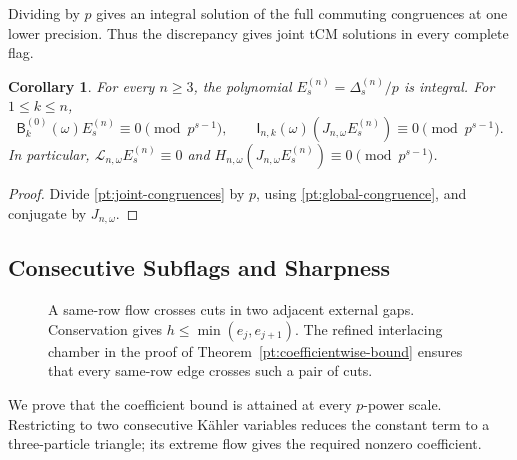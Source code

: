 \documentclass[11pt]{amsart}
\newtheorem{corollary}[theorem]{Corollary}
\theoremstyle{definition}
\theoremstyle{remark}
\numberwithin{equation}{section}
\begin{document}
Dividing by $p$ gives an integral solution of the full commuting
congruences at one lower precision. Thus the discrepancy gives
joint tCM solutions in every complete flag.

\begin{corollary}\label{pt:normalized-kernel}
For every $n\geq3$, the polynomial
$E_s^{(n)}=\Delta_s^{(n)}/p$ is integral. For $1\leq k\leq n$,
\[
 \mathsf B_k^{(0)}(\omega)E_s^{(n)}\equiv0\pmod{p^{s-1}},\qquad
 \mathsf I_{n,k}(\omega)(J_{n,\omega}E_s^{(n)})
       \equiv0\pmod{p^{s-1}}.
\]
In particular, $\mathcal L_{n,\omega}E_s^{(n)}\equiv0$ and
$H_{n,\omega}(J_{n,\omega}E_s^{(n)})\equiv0\pmod{p^{s-1}}$.
\end{corollary}

\begin{proof}
Divide \eqref{pt:joint-congruences} by $p$, using
\eqref{pt:global-congruence}, and conjugate by $J_{n,\omega}$.
\end{proof}

\subsection{Consecutive Subflags and Sharpness}
\begin{figure}[t]
\centering
{}
\caption{A same-row flow crosses cuts in two adjacent external
gaps. Conservation gives $h\leq\min(e_j,e_{j+1})$.
The refined interlacing chamber in the proof of
Theorem~\ref{pt:coefficientwise-bound} ensures that every
same-row edge crosses such a pair of cuts.}
\label{pt:cut-figure}
\end{figure}

We prove that the coefficient bound is attained at every
$p$-power scale. Restricting to two consecutive K\"ahler
variables reduces the constant term to a three-particle triangle;
its extreme flow gives the required nonzero coefficient.
\end{document}
